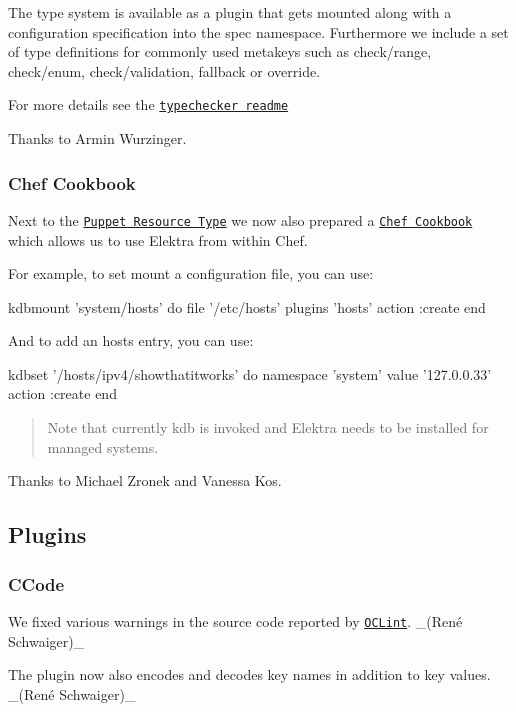 The type system is available as a plugin that gets mounted along with a configuration specification into the spec namespace. Furthermore we include a set of type definitions for commonly used metakeys such as {\ttfamily check/range}, {\ttfamily check/enum}, {\ttfamily check/validation}, {\ttfamily fallback} or {\ttfamily override}.

For more details see the \href{https://www.libelektra.org/plugins/typechecker}{\tt typechecker readme}

Thanks to Armin Wurzinger.

\subsubsection*{Chef Cookbook}

Next to the \href{http://puppet.libelektra.org/}{\tt Puppet Resource Type} we now also prepared a \href{https://supermarket.chef.io/cookbooks/kdb}{\tt Chef Cookbook} which allows us to use Elektra from within Chef.

For example, to set mount a configuration file, you can use\+:


\begin{DoxyCode}
kdbmount 'system/hosts' do
        file '/etc/hosts'
        plugins 'hosts'
        action :create
end
\end{DoxyCode}


And to add an hosts entry, you can use\+:


\begin{DoxyCode}
kdbset '/hosts/ipv4/showthatitworks' do
        namespace 'system'
        value '127.0.0.33'
        action :create
end
\end{DoxyCode}


\begin{quote}
Note that currently {\ttfamily kdb} is invoked and Elektra needs to be installed for managed systems. \end{quote}


Thanks to Michael Zronek and Vanessa Kos.

\subsection*{Plugins}

\subsubsection*{C\+Code}


\begin{DoxyItemize}
\item We fixed various warnings in the source code reported by \href{http://oclint.org}{\tt O\+C\+Lint}. \+\_\+(René Schwaiger)\+\_\+
\item The plugin now also encodes and decodes key names in addition to key values. \+\_\+(René Schwaiger)\+\_\+
\end{DoxyItemize}

